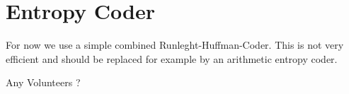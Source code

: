 
\section{ Entropy Coder }

For now we use a simple combined Runleght-Huffman-Coder. This is not very
efficient and should be replaced for example by an arithmetic entropy coder.

Any Volunteers ?

